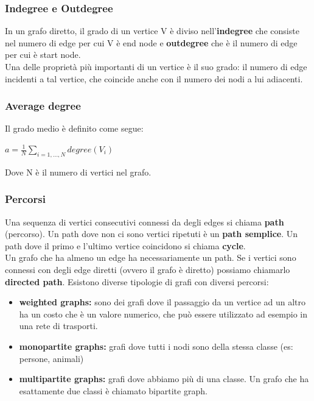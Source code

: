 \subsubsection*{Indegree e Outdegree}

In un grafo diretto, il grado di un vertice V è diviso nell'\textbf{indegree} che consiste nel numero di edge per cui V è end node e \textbf{outdegree} che è il numero di edge per cui è start node.
\\
Una delle proprietà più importanti di un vertice è il suo grado: il numero di edge incidenti a tal vertice, che coincide anche con il numero dei nodi a lui adiacenti. 
\subsubsection*{Average degree}
Il grado medio è definito come segue:
\begin{center}
        \begin{math}
            a = \frac{1}{N} \sum_{i = 1,...,N} degree(V_i)
        \end{math}
\end{center}
Dove N è il numero di vertici nel grafo.

\subsubsection*{Percorsi}
 Una sequenza di vertici consecutivi connessi da degli edges si chiama \textbf{path} (percorso). Un path dove non ci sono vertici ripetuti è un \textbf{path semplice}. Un path dove il primo e l'ultimo vertice coincidono si chiama \textbf{cycle}. 
 \\
Un grafo che ha almeno un edge ha necessariamente un path. Se i vertici sono connessi con degli edge diretti (ovvero il grafo è diretto) possiamo chiamarlo \textbf{directed path}. Esistono diverse tipologie di grafi con diversi percorsi:
\begin{itemize}
    \item \textbf{weighted graphs:} sono dei grafi dove il passaggio da un vertice ad un altro ha un costo che è un valore numerico, che può essere utilizzato ad esempio in una rete di trasporti. 
    \item \textbf{monopartite graphs:} grafi dove tutti i nodi sono della stessa classe (es: persone, animali)
    \item \textbf{multipartite graphs:} grafi dove abbiamo più di una classe. Un grafo che ha esattamente due classi è chiamato bipartite graph.
\end{itemize}
